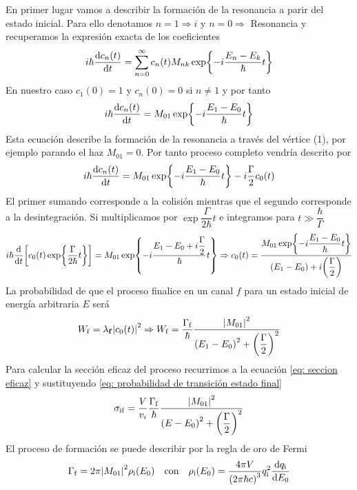 En primer lugar vamos a describir la formación de la resonancia a parir del estado inicial. Para ello
denotamos $n=1 \Rightarrow i$ y $n=0 \Rightarrow$ Resonancia y recuperamos la expresión exacta de los coeficientes 
\begin{equation}
    i\hbar \dv{c_n(t)}{t}=\sum_{n=0}^\infty c_n(t) M_{nk} \exp{-i\frac{E_n-E_k}{\hbar}t}
\end{equation}
En nuestro caso $c_1(0)=1$ y $c_n(0)=0$ si $n\neq 1$ y por tanto
\begin{equation}
    i\hbar \dv{c_n(t)}{t}=M_\mathrm{01} \exp{-i\frac{E_1-E_0}{\hbar}t} 
\end{equation}
Esta ecuación describe la formación de la resonancia a través del vértice (1), por ejemplo parando el haz $M_{01}=0$. Por tanto proceso completo vendría descrito por 
\begin{equation}
    i\hbar \dv{c_n(t)}{t}=M_\mathrm{01} \exp{-i\frac{E_1-E_0}{\hbar}t} - i\frac{\Gamma}{2}c_0(t)
\end{equation}
El primer sumando corresponde a la colisión mientras que el segundo corresponde a la desintegración.
Si multiplicamos por $\exp{\dfrac{\Gamma}{2\hbar}t}$ e  integramos para $t\gg \dfrac{\hbar}{\Gamma}$ 
\begin{equation*}
    i\hbar \dv{}{t} \qty[c_0(t)\exp{\dfrac{\Gamma}{2\hbar}t}]=M_{01} \exp{-i\dfrac{E_1-E_0+i\dfrac{\Gamma}{2}}{\hbar}t} \Rightarrow c_0(t)=\frac{M_{01} \exp{-i\dfrac{E_1-E_0}{\hbar}t}}{\qty(E_1-E_0)+i\qty(\dfrac{\Gamma}{2})}
\end{equation*}
La probabilidad de que el proceso finalice en un canal $f$ para un estado inicial de energía arbitraria $E$ será
\begin{equation}
    W_\mathrm{f}=\lambda_\mathbf{f}\abs{c_0(t)}^2 \Rightarrow W_\mathrm{f}=\frac{\Gamma_\mathrm{f}}{\hbar}
    \frac{\abs{M_{01}}^2}{\qty(E_1-E_0)^2+\qty(\dfrac{\Gamma}{2})^2}
    \label{eq: probabilidad de transición estado final}
\end{equation}
Para calcular la sección eficaz del proceso recurrimos a la ecuación \ref{eq: seccion eficaz} y sustituyendo \ref{eq: probabilidad de transición estado final}
\begin{equation}
    \sigma_\mathrm{if}=\frac{V}{v_i}\frac{\Gamma_\mathrm{f}}{\hbar}
    \frac{\abs{M_{01}}^2}{\qty(E-E_0)^2+\qty(\dfrac{\Gamma}{2})^2}
\end{equation}
El proceso de formación se puede describir por la regla de oro de Fermi
\begin{equation}
    \Gamma_\mathrm{f}=2\pi \abs{M_\mathrm{01}}^2 \rho_\mathrm{i}(E_0) \quad \text{con} \quad \rho_\mathrm{i}(E_0)=
    \frac{4\pi V}{\qty(2\pi\hbar c)^3} q_\mathrm{i}^2 \dv{q_\mathrm{i}}{E_0}
\end{equation}
